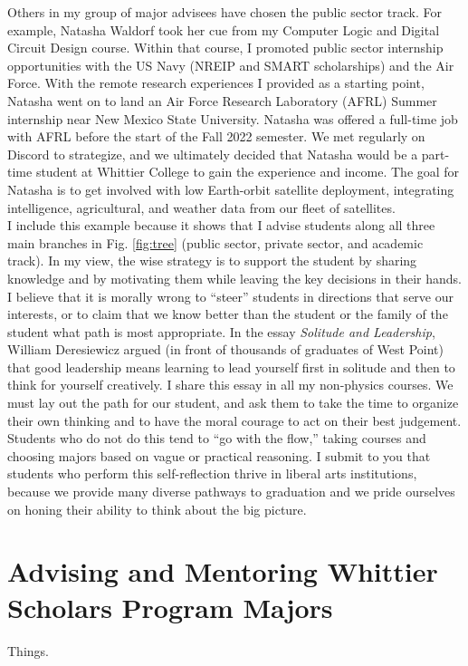 \documentclass[../../main.tex]{subfiles}
\begin{document}
Others in my group of major advisees have chosen the public sector track.  For example, Natasha Waldorf took her cue from my Computer Logic and Digital Circuit Design course.  Within that course, I promoted public sector internship opportunities with the US Navy (NREIP and SMART scholarships) and the Air Force.  With the remote research experiences I provided as a starting point, Natasha went on to land an Air Force Research Laboratory (AFRL) Summer internship near New Mexico State University.  Natasha was offered a full-time job with AFRL before the start of the Fall 2022 semester.  We met regularly on Discord to strategize, and we ultimately decided that Natasha would be a part-time student at Whittier College to gain the experience and income.  The goal for Natasha is to get involved with low Earth-orbit satellite deployment, integrating intelligence, agricultural, and weather data from our fleet of satellites.
\\
\vspace{0.25cm}
I include this example because it shows that I advise students along all three main branches in Fig. \ref{fig:tree} (public sector, private sector, and academic track).  In my view, the wise strategy is to support the student by sharing knowledge and by motivating them while leaving the key decisions in their hands.  I believe that it is morally wrong to ``steer'' students in directions that serve our interests, or to claim that we know better than the student or the family of the student what path is most appropriate.  In the essay \textit{Solitude and Leadership}, William Deresiewicz argued (in front of thousands of graduates of West Point) \cite{west_point} that good leadership means learning to lead yourself first in solitude and then to think for yourself creatively.  I share this essay in all my non-physics courses.  We must lay out the path for our student, and ask them to take the time to organize their own thinking and to have the moral courage to act on their best judgement.  Students who do not do this tend to ``go with the flow,'' taking courses and choosing majors based on vague or practical reasoning.  I submit to you that students who perform this self-reflection thrive in liberal arts institutions, because we provide many diverse pathways to graduation and we pride ourselves on honing their ability to think about the big picture.

\section{Advising and Mentoring Whittier Scholars Program Majors}

Things.
\end{document}

